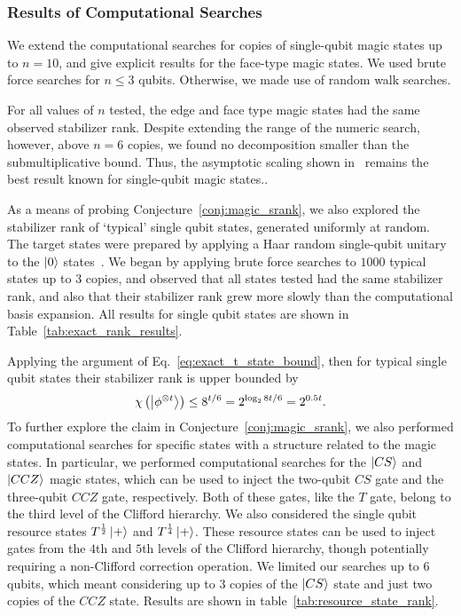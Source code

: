 \subsubsection*{Results of Computational Searches}
We extend the computational searches for copies of single-qubit magic states up to $n=10$, and give explicit results for the face-type magic states. We used brute force searches for $n\leq 3$ qubits. Otherwise, we made use of random walk searches. 
\par
For all values of $n$ tested, the edge and face type magic states had the same observed stabilizer rank. Despite extending the range of the numeric search, however, above $n=6$ copies, we found no decomposition smaller than the submultiplicative bound. Thus, the asymptotic scaling shown in~\cite{Bravyi2015} remains the best result known for single-qubit magic states..\par
As a means of probing Conjecture~\ref{conj:magic_srank}, we also explored the stabilizer rank of `typical' single qubit states, generated uniformly at random. The target states were prepared by applying a Haar random single-qubit unitary to the $\ket{0}$ states~\cite{Lundberg2004}. We began by applying brute force searches to $1000$ typical states up to $3$ copies, and observed that all states tested had the same stabilizer rank, and also that their stabilizer rank grew more slowly than the computational basis expansion. All results for single qubit states are shown in Table~\ref{tab:exact_rank_results}.\par
Applying the argument of Eq.~\ref{eq:exact_t_state_bound}, then for typical single qubit states their stabilizer rank is upper bounded by
\begin{equation}
\chi\left(\ket{\phi^{\otimes t}}\right)\leq 8^{t/6}=2^{\log_{2}{8}t/6}=2^{0.5t}.
\label{eq:typical_state_srank}
\end{equation}
To further explore the claim in Conjecture~\ref{conj:magic_srank}, we also performed computational searches for specific states with a structure related to the magic states. In particular, we performed computational searches for the $\ket{CS}$ and $\ket{CCZ}$ magic states, which can be used to inject the two-qubit $CS$ gate and the three-qubit $CCZ$ gate, respectively. Both of these gates, like the $T$ gate, belong to the third level of the Clifford hierarchy. We also considered the single qubit resource states $T^{\frac{1}{2}}\ket{+}$ and $T^{\frac{1}{4}}\ket{+}$. These resource states can be used to inject gates from the $4$th and $5$th levels of the Clifford hierarchy, though potentially requiring a non-Clifford correction operation. We limited our searches up to $6$ qubits, which meant considering up to $3$ copies of the $\ket{CS}$ state and just two copies of the $CCZ$ state. Results are shown in table~\ref{tab:resource_state_rank}.\par
